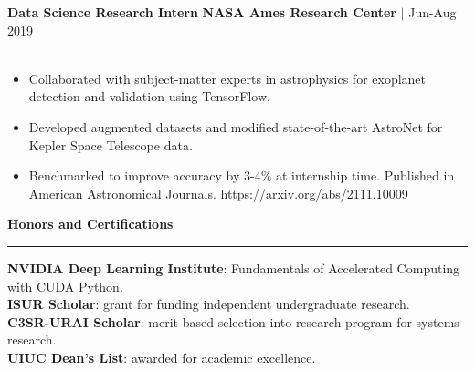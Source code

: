 \documentclass{cv}
\newcommand*{\labelfont}{\fontfamily{bch}\selectfont}
\begin{document}

{\labelfont \textbf{Data Science Research Intern} \hspace*{6cm} \textbf{NASA Ames Research Center} $|$ Jun-Aug 2019}\\
\vspace*{-25pt}\\
{
\small
\begin{itemize}
\setlength\itemsep{-2.5pt}
    \item Collaborated with subject-matter experts in astrophysics for exoplanet detection and validation using TensorFlow.
    \item Developed augmented datasets and modified state-of-the-art AstroNet for Kepler Space Telescope data.
    \item Benchmarked to improve accuracy by 3-4\% at internship time. Published in American Astronomical Journals. \url{https://arxiv.org/abs/2111.10009}
\end{itemize}
}

{\large {\textbf{Honors and Certifications}}}\vspace*{-6pt}\\
\rule{\textwidth}{0.4pt}
{\labelfont \textbf{NVIDIA Deep Learning Institute}}: Fundamentals of Accelerated Computing with CUDA Python.\\
{\labelfont \textbf{ISUR Scholar}}: grant for funding independent undergraduate research.\\
{\labelfont \textbf{C3SR-URAI Scholar}}: merit-based selection into research program for systems research.\\
{\labelfont \textbf{UIUC Dean's List}}: awarded for academic excellence.\\
\end{document}
